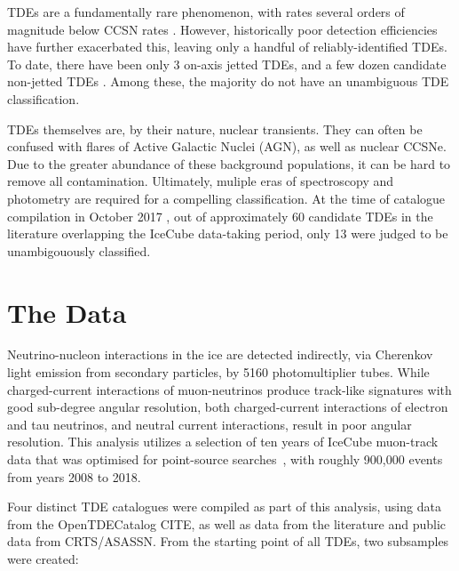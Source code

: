 \documentclass[twocolumn, tighten, linenumbers]{aastex62}
\begin{document}
TDEs are a fundamentally rare phenomenon, with rates several orders of magnitude below CCSN rates \cite{vanVelzen:2017qum}. However, historically poor detection efficiencies have further exacerbated this, leaving only a handful of reliably-identified TDEs. To date, there have been only 3 on-axis jetted TDEs, and a few dozen candidate non-jetted TDEs \cite{Komossa:2015qya, Auchettl:2016qfa}. Among these, the majority do not have an unambiguous TDE classification. 

TDEs themselves are, by their nature, nuclear transients. They can often be confused with flares of Active Galactic Nuclei (AGN), as well as nuclear CCSNe. Due to the greater abundance of these background populations, it can be hard to remove all contamination. Ultimately, muliple eras of spectroscopy and photometry are required for a compelling classification. At the time of catalogue compilation in October 2017 \cite{Auchettl:2016qfa}, out of approximately 60 candidate TDEs in the literature overlapping the IceCube data-taking period, only 13 were judged to be unambigouously classified. 


\section{The Data}
\label{sec:data}
Neutrino-nucleon interactions in the ice are detected indirectly, via Cherenkov light emission from secondary particles, by 5160 photomultiplier tubes. While charged-current interactions of muon-neutrinos produce track-like signatures with good sub-degree angular resolution, both charged-current interactions of electron and tau neutrinos, and neutral current interactions, result in poor angular resolution. This analysis utilizes a selection of ten years of IceCube muon-track data that was optimised for point-source searches~\citep{Aartsen:2016oji}, with roughly 900,000 events from years 2008 to 2018.

Four distinct TDE catalogues were compiled as part of this analysis, using data from the OpenTDECatalog CITE, as well as data from the literature and public data from CRTS/ASASSN. From the starting point of all TDEs, two subsamples were created:
\end{document}
